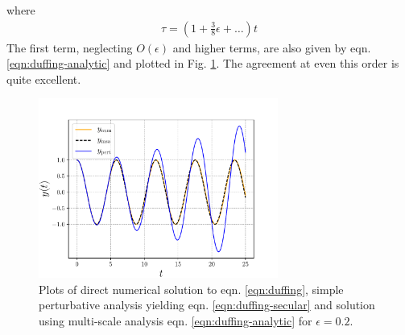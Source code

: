where 
\begin{gather*}
	\tau = \left(1 + \frac{3}{8}\epsilon + \dots\right) t
\end{gather*}
The first term, neglecting $O(\epsilon)$ and higher terms, are also given by eqn. \ref{eqn:duffing-analytic} and plotted in Fig. \ref{fig:duffing}. The agreement at even this order is quite excellent.
\begin{figure}[!h]
	\centering
	\includegraphics[width=0.7\textwidth]{./plots/pdf/strogatz-wk22-duffing.pdf}
	\caption{Plots of direct numerical solution to eqn. \ref{eqn:duffing}, simple perturbative analysis yielding eqn. \ref{eqn:duffing-secular} and solution using multi-scale analysis eqn. \ref{eqn:duffing-analytic} for $\epsilon=0.2$. }
	\label{fig:duffing}
\end{figure}